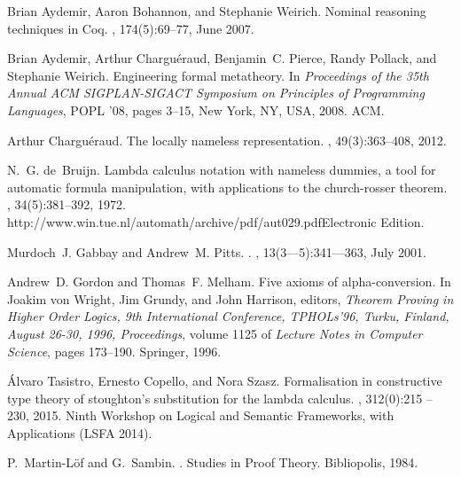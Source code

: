 \documentclass{entcs}
\begin{document}
\begin{thebibliography}{10}

Brian Aydemir, Aaron Bohannon, and Stephanie Weirich.
\newblock Nominal reasoning techniques in {C}oq.
, 174(5):69--77, June 2007.

Brian Aydemir, Arthur Chargu{\'e}raud, Benjamin~C. Pierce, Randy Pollack, and
  Stephanie Weirich.
\newblock Engineering formal metatheory.
\newblock In {\em Proceedings of the 35th Annual ACM SIGPLAN-SIGACT Symposium
  on Principles of Programming Languages}, POPL '08, pages 3--15, New York, NY,
  USA, 2008. ACM.

Arthur Chargu{\'{e}}raud.
\newblock The locally nameless representation.
, 49(3):363--408, 2012.

N.~G. de~Bruijn.
\newblock Lambda calculus notation with nameless dummies, a tool for automatic
  formula manipulation, with applications to the church-rosser theorem.
, 34(5):381--392, 1972.
\newblock http://www.win.tue.nl/automath/archive/pdf/aut029.pdfElectronic
  Edition.

Murdoch~J. Gabbay and Andrew~M. Pitts.
.
, 13(3—5):341—363, July 2001.

Andrew~D. Gordon and Thomas~F. Melham.
\newblock Five axioms of alpha-conversion.
\newblock In Joakim von Wright, Jim Grundy, and John Harrison, editors, {\em
  Theorem Proving in Higher Order Logics, 9th International Conference,
  TPHOLs'96, Turku, Finland, August 26-30, 1996, Proceedings}, volume 1125 of
  {\em Lecture Notes in Computer Science}, pages 173--190. Springer, 1996.

Álvaro Tasistro, Ernesto Copello, and Nora Szasz.
\newblock Formalisation in constructive type theory of stoughton's substitution
  for the lambda calculus.
, 312(0):215 --
  230, 2015.
\newblock Ninth Workshop on Logical and Semantic Frameworks, with Applications
  (LSFA 2014).

P.~Martin-L{\"o}f and G.~Sambin.
.
\newblock Studies in Proof Theory. Bibliopolis, 1984.


\end{thebibliography}
\end{document}
